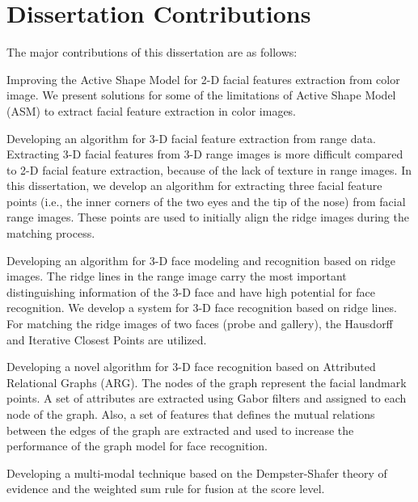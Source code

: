 \section{Dissertation Contributions}
The major contributions of this dissertation are as follows:
\bi
\item
Improving the Active Shape Model for 2-D facial features extraction
from color image. We present solutions for some of the limitations
of Active Shape Model (ASM) to extract facial feature extraction in
color images.

\item
Developing an algorithm for 3-D facial feature extraction from range
data. Extracting 3-D facial features from 3-D range images is more
difficult compared to 2-D facial feature extraction, because of the
lack of texture in range images. In this dissertation, we develop an
algorithm for extracting three facial feature points (i.e., the
inner corners of the two eyes and the tip of the nose) from facial
range images. These points are used to initially align the ridge
images during the matching process.

\item
Developing an algorithm for 3-D face modeling and recognition based
on ridge images. The ridge lines in the range image carry the most
important distinguishing information of the 3-D face and have high
potential for face recognition. We develop a system for 3-D face
recognition based on ridge lines. For matching the ridge images of
two faces (probe and gallery), the Hausdorff and Iterative Closest
Points are utilized.

\item
Developing a novel algorithm for 3-D face recognition based on
Attributed Relational Graphs (ARG). The nodes of the graph represent
the facial landmark points. A set of attributes are extracted using
Gabor filters and assigned to each node of the graph. Also, a set of
features that defines the mutual relations between the edges of the
graph are extracted and used to increase the performance of the
graph model for face recognition.

\item Developing a multi-modal technique based on the Dempster-Shafer theory
of evidence and the weighted sum rule for fusion at the score level.
\ei

